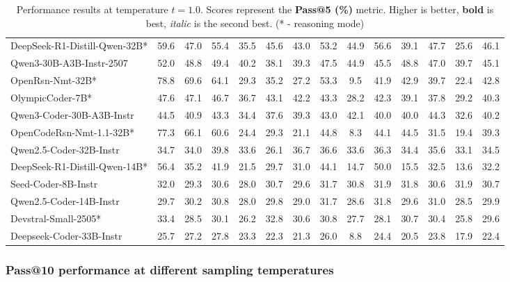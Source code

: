 \documentclass{llmxive}
\begin{document}
\begin{table}[hbt]
{\begin{tabular}{l *{13}{c}}
DeepSeek-R1-Distill-Qwen-32B*&	59.6&	47.0&	55.4&	35.5&	45.6&	43.0&	53.2&	44.9&	56.6&	39.1&	47.7&	25.6&	46.1\\												
\rowcolor{gray!10}
Qwen3-30B-A3B-Instr-2507&	52.0&	48.8&	49.4&	40.2&	38.1&	39.3&	47.5&	44.9&	45.5&	48.8&	47.0&	39.7&	45.1\\												
OpenRsn-Nmt-32B*&	78.8&	69.6&	64.1&	29.3&	35.2&	27.2&	53.3&	9.5&	41.9&	42.9&	39.7&	22.4&	42.8\\												
\rowcolor{gray!10}
OlympicCoder-7B*&	47.6&	47.1&	46.7&	36.7&	43.1&	42.2&	43.3&	28.2&	42.3&	39.1&	37.8&	29.2&	40.3\\												
Qwen3-Coder-30B-A3B-Instr&	44.5&	40.9&	43.3&	34.4&	37.6&	39.3&	43.0&	42.1&	40.0&	40.0&	44.3&	32.6&	40.2\\										
\rowcolor{gray!10}
OpenCodeRsn-Nmt-1.1-32B*&	77.3&	66.1&	60.6&	24.4&	29.3&	21.1&	44.8&	8.3&	44.1&	44.5&	31.5&	19.4&	39.3\\												
Qwen2.5-Coder-32B-Instr&	34.7&	34.0&	39.8&	33.6&	26.1&	36.7&	36.6&	33.6&	36.3&	34.4&	35.6&	33.1&	34.5\\											
\rowcolor{gray!10}
DeepSeek-R1-Distill-Qwen-14B*&	56.4&	35.2&	41.9&	21.5&	29.7&	31.0&	44.1&	14.7&	50.0&	15.5&	32.5&	13.6&	32.2\\												
Seed-Coder-8B-Instr&	32.0&	29.3&	30.6&	28.0&	30.7&	29.6&	31.7&	30.8&	31.9&	31.8&	30.6&	31.9&	30.7\\													
\rowcolor{gray!10}
Qwen2.5-Coder-14B-Instr&	29.7&	30.2&	30.8&	28.0&	29.8&	29.0&	31.7&	28.6&	31.8&	29.6&	31.0&	28.5&	29.9\\															
Devstral-Small-2505*&	33.4&	28.5&	30.1&	26.2&	32.8&	30.6&	30.8&	27.7&	28.1&	30.7&	30.4&	25.8&	29.6\\													
\rowcolor{gray!10}
Deepseek-Coder-33B-Instr&	25.7&	27.2&	27.8&	23.3&	22.3&	21.3&	26.0&	8.8&	24.4&	20.5&	23.8&	17.9&	22.4\\															


\bottomrule
\end{tabular}%
}
\caption{Performance results at temperature $t=1.0$. Scores represent the \textbf{Pass@5 (\%)} metric. Higher is better, \textbf{bold} is best, \textit{italic} is the second best. (* - reasoning mode)}
\label{tab_exps_feb25_pass5_t1.0}
\end{table}



\subsubsection{Pass@10 performance at different sampling temperatures}
\end{document}
